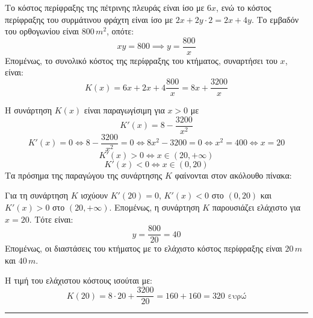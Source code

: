 \begin{center}
\end{center}
\begin{alist}
\item Το κόστος περίφραξης της πέτρινης πλευράς είναι ίσο με $6x$, ενώ το κόστος περίφραξης του συρμάτινου φράχτη είναι ίσο με $2x + 2y \cdot 2 = 2x + 4y$.
Το εμβαδόν του ορθογωνίου είναι $800 \, m^2$, οπότε:
\[ xy = 800 \implies y = \frac{800}{x} \]
Επομένως, το συνολικό κόστος της περίφραξης του κτήματος, συναρτήσει του $x$, είναι:
\[ K(x) = 6x + 2x + 4\frac{800}{x} = 8x + \frac{3200}{x} \]
\item Η συνάρτηση $K(x)$ είναι παραγωγίσιμη για $x > 0$ με
\[ K'(x) = 8 - \frac{3200}{x^2} \]
\[ K'(x) = 0 \Leftrightarrow 8 - \frac{3200}{x^2} = 0 \Leftrightarrow 8x^2 - 3200 = 0 \Leftrightarrow x^2 = 400 \Leftrightarrow x = 20 \]
\[ K'(x) > 0 \Leftrightarrow x \in (20, +\infty) \]
\[ K'(x) < 0 \Leftrightarrow x \in (0, 20) \]
Τα πρόσημα της παραγώγου της συνάρτησης $K$ φαίνονται στον ακόλουθο πίνακα:
\begin{center}
\end{center}
Για τη συνάρτηση $K$ ισχύουν $K'(20) = 0$, $K'(x) < 0$ στο $(0, 20)$ και $K'(x) > 0$ στο $(20, +\infty)$. Επομένως, η συνάρτηση $K$ παρουσιάζει ελάχιστο για $x = 20$. Τότε είναι:
\[ y = \frac{800}{20} = 40 \]
Επομένως, οι διαστάσεις του κτήματος με το ελάχιστο κόστος περίφραξης είναι $20 \, m$ και $40 \, m$.
\item Η τιμή του ελάχιστου κόστους ισούται με:
\[ K(20) = 8 \cdot 20 + \frac{3200}{20} = 160 + 160 = 320 \text{ ευρώ} \]
\end{alist}
\vspace{6mm}
\noindent\rule{\textwidth}{0.4pt}
\vspace{6mm}

